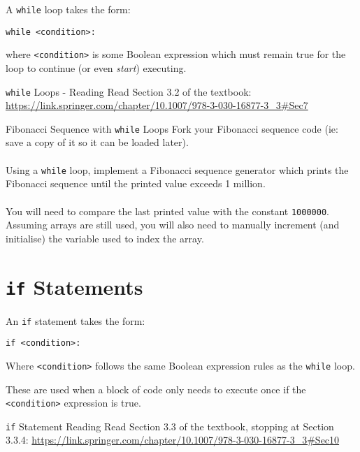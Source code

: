 \documentclass{lab}
\begin{document}
A \texttt{while} loop takes the form:

\texttt{while <condition>:}

where \texttt{<condition>} is some Boolean expression which must remain true for the loop to continue (or even \textit{start}) executing.

\begin{task}{\texttt{while} Loops - Reading}{}
Read Section 3.2 of the textbook: \url{https://link.springer.com/chapter/10.1007/978-3-030-16877-3_3#Sec7}
\end{task}

\begin{task}{Fibonacci Sequence with \texttt{while} Loops}{}
Fork your Fibonacci sequence code (ie: save a copy of it so it can be loaded later).
\\~\\
Using a \texttt{while} loop, implement a Fibonacci sequence generator which prints the Fibonacci sequence until the printed value exceeds 1 million.
\\~\\
You will need to compare the last printed value with the constant \texttt{1000000}. Assuming arrays are still used, you will also need to manually increment (and initialise) the variable used to index the array.
\end{task}

\pagebreak
\section{\texttt{if} Statements}
An \texttt{if} statement takes the form:

\texttt{if <condition>:}

Where \texttt{<condition>} follows the same Boolean expression rules as the \texttt{while} loop.

These are used when a block of code only needs to execute once if the \texttt{<condition>} expression is true.

\begin{task}{\texttt{if} Statement Reading}{}
Read Section 3.3 of the textbook, stopping at Section 3.3.4: \url{https://link.springer.com/chapter/10.1007/978-3-030-16877-3_3#Sec10} 
\end{task}
\end{document}
